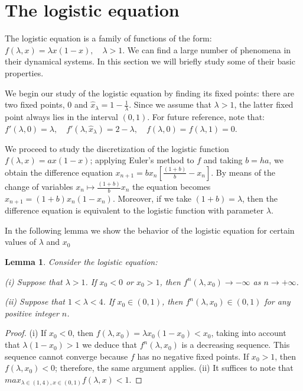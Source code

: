 \documentclass[12pt,a4paper]{report}
\newtheorem{lema}{Lemma}[section]
\theoremstyle{definition}
\begin{document}
\section{The logistic equation}\label{sec:logistic}

The logistic equation is a family of functions of the form:
$
f(\lambda, x) = \lambda x (1 - x), \quad \lambda > 1.
$
We can find a large number of phenomena in their dynamical systems. In this section we will briefly study some of their basic properties.

We begin our study of the logistic equation by finding its fixed points: there are two fixed points, $0$ and $\hat{x}_\lambda = 1 - \frac{1}{\lambda}$. Since we assume that $\lambda > 1$, the latter fixed point always lies in the interval $(0, 1)$. For future reference, note that:
$
f'(\lambda, 0) = \lambda, \quad f'(\lambda, \hat{x}_\lambda) = 2 - \lambda, \quad f(\lambda, 0) = f(\lambda, 1) = 0.
$

We proceed to study the discretization of the logistic function $f(\lambda,x) = ax(1-x)$; applying Euler's method to $f$ and taking $b = ha$, we obtain the difference equation 
$x_{n+1} = b x_n \left[\frac{(1 + b)}{b} - x_n \right]$. By means of the change of variables $x_n \mapsto \frac{(1 + b)}{b} x_n$ the equation becomes $
x_{n+1} = (1 + b) x_n (1 - x_n)$. Moreover, if we take $(1 + b) = \lambda$, then the difference equation is equivalent to the logistic function with parameter $\lambda$.

 In the following lemma we show the behavior of the logistic equation for certain values of $\lambda$ and $x_0$

\begin{lema}
Consider the logistic equation:

(i) Suppose that $\lambda > 1$. If $x_0 < 0$ or $x_0 > 1$, then $f^n(\lambda, x_0) \to -\infty$ as $n \to +\infty$.

(ii) Suppose that $1 < \lambda < 4$. If $x_0 \in (0, 1)$, then $f^n(\lambda, x_0) \in (0, 1)$ for any positive integer $n$.
\end{lema}

\begin{proof}

(i) If $x_0 < 0$, then $f(\lambda, x_0) =  \lambda x_0 (1 - x_0) < x_0$, taking into account that $\lambda(1 - x_0) > 1 $ we deduce that $f^n(\lambda, x_0)$ is a decreasing sequence. This sequence cannot converge because $f$ has no negative fixed points. If $x_0 > 1$, then $f(\lambda, x_0) < 0$; therefore, the same argument applies. (ii) It suffices to note that $max_{\lambda \in (1,4), x\in (0,1)}{f(\lambda, x)} < 1$.
\end{proof}
\end{document}
